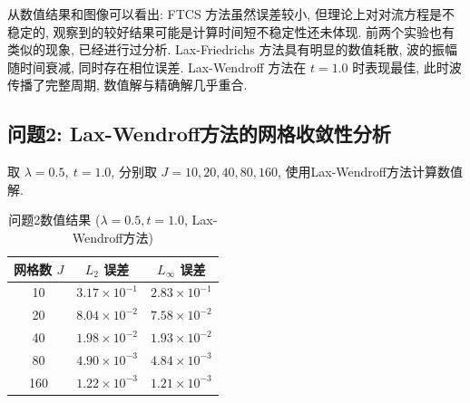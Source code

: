 \documentclass[12pt,a4paper]{article}
\begin{document}
            从数值结果和图像可以看出: FTCS 方法虽然误差较小, 但理论上对对流方程是不稳定的, 观察到的较好结果可能是计算时间短不稳定性还未体现. 前两个实验也有类似的现象, 已经进行过分析. Lax-Friedrichs 方法具有明显的数值耗散, 波的振幅随时间衰减, 同时存在相位误差. Lax-Wendroff 方法在 $ t = 1.0 $ 时表现最佳, 此时波传播了完整周期, 数值解与精确解几乎重合.

        \subsection{问题2: Lax-Wendroff方法的网格收敛性分析}
            取 $ \lambda = 0.5, \ t = 1.0 $, 分别取 $ J = 10, 20, 40, 80, 160 $, 使用Lax-Wendroff方法计算数值解.

            \begin{table}[H]
                \centering
                \caption{问题2数值结果 ($ \lambda = 0.5, t = 1.0 $, Lax-Wendroff方法)}
                \begin{tabular}{ccc}
                    \toprule
                    网格数 $ J $ & $ L_2 $ 误差 & $ L_\infty $ 误差 \\
                    \midrule
                    10 & $ 3.17 \times 10^{-1} $ & $ 2.83 \times 10^{-1} $ \\
                    20 & $ 8.04 \times 10^{-2} $ & $ 7.58 \times 10^{-2} $ \\
                    40 & $ 1.98 \times 10^{-2} $ & $ 1.93 \times 10^{-2} $ \\
                    80 & $ 4.90 \times 10^{-3} $ & $ 4.84 \times 10^{-3} $ \\
                    160 & $ 1.22 \times 10^{-3} $ & $ 1.21 \times 10^{-3} $ \\
                    \bottomrule
                \end{tabular}
            \end{table}
\end{document}
